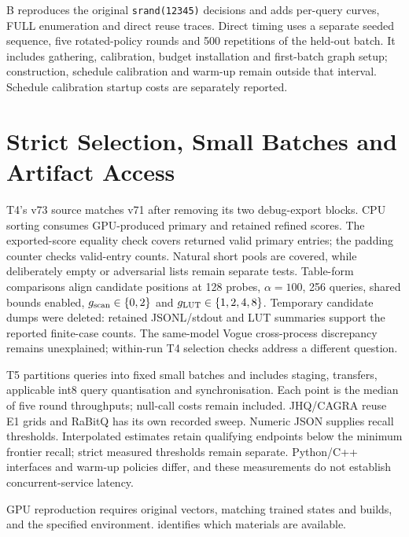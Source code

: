 B reproduces the original \texttt{srand(12345)} decisions and adds
per-query curves, FULL enumeration and direct reuse traces. Direct
timing uses a separate seeded sequence, five rotated-policy rounds and
500 repetitions of the held-out batch. It includes gathering,
calibration, budget installation and first-batch graph setup; construction,
schedule calibration and warm-up remain outside that interval. Schedule
calibration startup costs are separately reported.

\section{Strict Selection, Small Batches and Artifact Access}
\label{sec:a-t4-t5}

T4's v73 source matches v71 after removing its two debug-export blocks.
CPU sorting consumes GPU-produced primary and retained refined scores.
The exported-score equality check covers returned valid primary entries;
the padding counter checks valid-entry counts. Natural short pools are
covered, while deliberately empty or adversarial lists remain separate
tests. Table-form comparisons align candidate positions at 128 probes,
$\alpha=100$, 256 queries, shared bounds enabled, $g_{\mathrm{scan}}\in\{0,2\}$ and
$g_{\mathrm{LUT}}\in\{1,2,4,8\}$. Temporary candidate dumps were deleted: retained
JSONL/stdout and LUT summaries support the reported finite-case counts.
The same-model Vogue cross-process discrepancy remains unexplained;
within-run T4 selection checks address a different question.

T5 partitions queries into fixed small batches and includes staging,
transfers, applicable int8 query quantisation and synchronisation. Each
point is the median of five round throughputs; null-call costs remain
included. JHQ/CAGRA reuse E1 grids and RaBitQ has its own recorded sweep.
Numeric JSON supplies recall thresholds. Interpolated estimates retain
qualifying endpoints below the minimum frontier recall; strict measured
thresholds remain separate. Python/C++ interfaces and warm-up policies
differ, and these measurements do not establish concurrent-service latency.

GPU reproduction requires original vectors, matching trained states and
builds, and the specified environment.  identifies
which materials are available.
